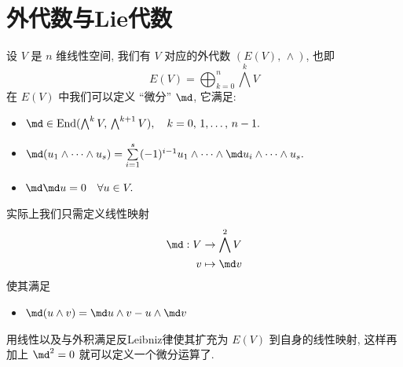 \section{外代数与Lie代数}
    设 $V$ 是 $n$ 维线性空间, 我们有 $V$ 对应的外代数 $(E(V),\,\wedge)$, 也即
    \begin{equation*}
        E(V) = \bigoplus_{k=0}^{n}\bigwedge^{k}V
    \end{equation*}
    在 $E(V)$ 中我们可以定义 “微分” $\md$, 它满足:
    \begin{itemize}
        \item $\md\in{\rm End}(\bigwedge^{k}V,\,\bigwedge^{k+1}V),\quad k=0,\,1,\dots,\,n-1.$
        \item $\md(u_1\wedge\cdots\wedge u_s) = \sum\limits_{i = 1}^{s}(-1)^{i-1}u_1\wedge\cdots\wedge \md u_i\wedge\cdots\wedge u_s.$
        \item $\md\md u = 0\quad \forall u\in V.$
    \end{itemize}
    实际上我们只需定义线性映射
    \begin{align*}
        \md:V&\rightarrow\bigwedge^2V\\
        v&\mapsto\md v
    \end{align*}
    使其满足
    \begin{itemize}
        \item $\md(u\wedge v) = \md u\wedge v-u\wedge\md v$
    \end{itemize}
    用线性以及与外积满足反Leibniz律使其扩充为 $E(V)$ 到自身的线性映射, 这样再加上 $\md^2 = 0$ 就可以定义一个微分运算了.

